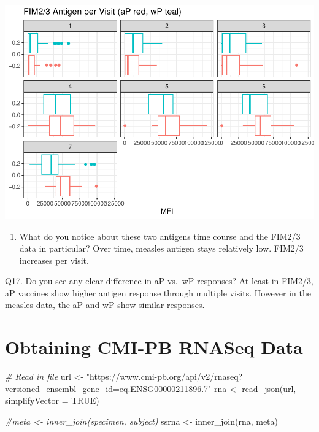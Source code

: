 \documentclass[
]{article}
\newenvironment{Shaded}{\begin{snugshade}}{\end{snugshade}}
\newcommand{\AttributeTok}[1]{\textcolor[rgb]{0.77,0.63,0.00}{#1}}
\newcommand{\CommentTok}[1]{\textcolor[rgb]{0.56,0.35,0.01}{\textit{#1}}}
\newcommand{\ConstantTok}[1]{\textcolor[rgb]{0.00,0.00,0.00}{#1}}
\newcommand{\FunctionTok}[1]{\textcolor[rgb]{0.00,0.00,0.00}{#1}}
\newcommand{\NormalTok}[1]{#1}
\newcommand{\OtherTok}[1]{\textcolor[rgb]{0.56,0.35,0.01}{#1}}
\newcommand{\StringTok}[1]{\textcolor[rgb]{0.31,0.60,0.02}{#1}}
\providecommand{\tightlist}{%
  \setlength{\itemsep}{0pt}\setlength{\parskip}{0pt}}
\begin{document}
\includegraphics{lab-19-143_files/figure-latex/unnamed-chunk-27-1.pdf}

\begin{enumerate}
\def\labelenumi{\arabic{enumi}.}
\setcounter{enumi}{15}
\tightlist
\item
  What do you notice about these two antigens time course and the FIM2/3
  data in particular? Over time, measles antigen stays relatively low.
  FIM2/3 increases per visit.
\end{enumerate}

Q17. Do you see any clear difference in aP vs.~wP responses? At least in
FIM2/3, aP vaccines show higher antigen response through multiple
visits. However in the measles data, the aP and wP show similar
responses.

\hypertarget{obtaining-cmi-pb-rnaseq-data}{%
\section{Obtaining CMI-PB RNASeq
Data}\label{obtaining-cmi-pb-rnaseq-data}}

\begin{Shaded}
\begin{Highlighting}[]
\CommentTok{\# Read in file}
\NormalTok{url }\OtherTok{\textless{}{-}} \StringTok{"https://www.cmi{-}pb.org/api/v2/rnaseq?versioned\_ensembl\_gene\_id=eq.ENSG00000211896.7"}
\NormalTok{rna }\OtherTok{\textless{}{-}} \FunctionTok{read\_json}\NormalTok{(url, }\AttributeTok{simplifyVector =} \ConstantTok{TRUE}\NormalTok{)}

\CommentTok{\#meta \textless{}{-} inner\_join(specimen, subject)}
\NormalTok{ssrna }\OtherTok{\textless{}{-}} \FunctionTok{inner\_join}\NormalTok{(rna, meta)}
\end{Highlighting}
\end{Shaded}
\end{document}
